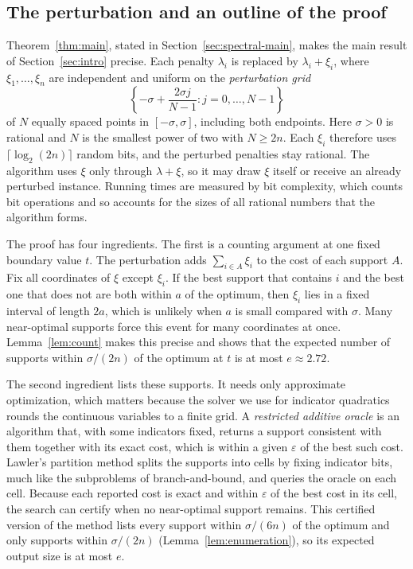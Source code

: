 \subsection{The perturbation and an outline of the proof}
\label{sec:main-result}
Theorem~\ref{thm:main}, stated in Section~\ref{sec:spectral-main},
makes the main result of Section~\ref{sec:intro} precise. Each penalty
$\lambda_i$ is replaced by $\lambda_i+\xi_i$, where $\xi_1,\ldots,\xi_n$
are independent and uniform on the \emph{perturbation grid}
\begin{equation}\label{eq:noisegrid}
 \left\{-\sigma+\frac{2\sigma j}{N-1}:j=0,\ldots,N-1\right\}
\end{equation}
of $N$ equally spaced points in $[-\sigma,\sigma]$, including both
endpoints. Here $\sigma>0$ is rational and $N$ is the smallest power of
two with $N\ge2n$. Each $\xi_i$ therefore uses $\lceil\log_2(2n)\rceil$
random bits, and the perturbed penalties stay rational. The algorithm
uses $\xi$ only through $\lambda+\xi$, so it may draw $\xi$ itself or
receive an already perturbed instance. Running times are measured by bit
complexity, which counts bit operations and so accounts for the sizes of
all rational numbers that the algorithm forms.

The proof has four ingredients. The first is a counting argument at one
fixed boundary value $t$. The perturbation adds $\sum_{i\in A}\xi_i$ to
the cost of each support $A$. Fix all coordinates of $\xi$ except
$\xi_i$. If the best support that contains $i$ and the best one that
does not are both within $a$ of the optimum, then $\xi_i$ lies in a
fixed interval of length $2a$, which is unlikely when $a$ is small
compared with $\sigma$. Many near-optimal supports force this event for
many coordinates at once. Lemma~\ref{lem:count} makes this precise and
shows that the expected number of supports within $\sigma/(2n)$ of the
optimum at $t$ is at most $e\approx2.72$.

The second ingredient lists these supports. It needs only approximate
optimization, which matters because the solver we use for indicator
quadratics rounds the continuous variables to a finite grid. A
\emph{restricted additive oracle} is an algorithm that, with some
indicators fixed, returns a support consistent with them together with
its exact cost, which is within a given $\varepsilon$ of the best such
cost. Lawler's partition method splits the supports into cells by fixing
indicator bits, much like the subproblems of branch-and-bound, and
queries the oracle on each cell. Because each reported cost is exact and
within $\varepsilon$ of the best cost in its cell, the search can
certify when no near-optimal support remains. This certified version of
the method lists every support within $\sigma/(6n)$ of the optimum and
only supports within $\sigma/(2n)$ (Lemma~\ref{lem:enumeration}), so its
expected output size is at most $e$.

